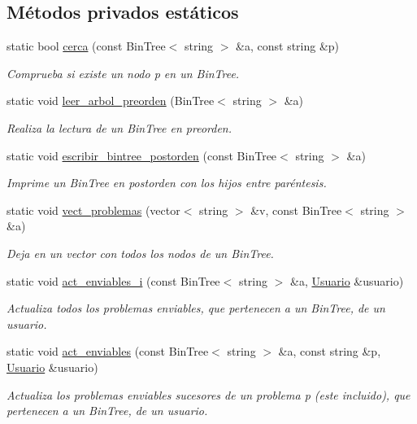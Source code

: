 \subsection*{Métodos privados estáticos}
\begin{DoxyCompactItemize}
\item 
static bool \mbox{\hyperlink{class_sesion_a975a083d65d04704efd0690de9d7f695}{cerca}} (const Bin\+Tree$<$ string $>$ \&a, const string \&p)
\begin{DoxyCompactList}\small\item\em Comprueba si existe un nodo p en un Bin\+Tree. \end{DoxyCompactList}\item 
static void \mbox{\hyperlink{class_sesion_ac3711bf39cf87739aff96ccebd6da0bc}{leer\+\_\+arbol\+\_\+preorden}} (Bin\+Tree$<$ string $>$ \&a)
\begin{DoxyCompactList}\small\item\em Realiza la lectura de un Bin\+Tree en preorden. \end{DoxyCompactList}\item 
static void \mbox{\hyperlink{class_sesion_aff16aa5e480925c7827221e326a345dc}{escribir\+\_\+bintree\+\_\+postorden}} (const Bin\+Tree$<$ string $>$ \&a)
\begin{DoxyCompactList}\small\item\em Imprime un Bin\+Tree en postorden con los hijos entre paréntesis. \end{DoxyCompactList}\item 
static void \mbox{\hyperlink{class_sesion_a9ed9478b2d860d8d713e19823febeaf3}{vect\+\_\+problemas}} (vector$<$ string $>$ \&v, const Bin\+Tree$<$ string $>$ \&a)
\begin{DoxyCompactList}\small\item\em Deja en un vector con todos los nodos de un Bin\+Tree. \end{DoxyCompactList}\item 
static void \mbox{\hyperlink{class_sesion_ad391d505577569f30635f19a0f36c9a0}{act\+\_\+enviables\+\_\+i}} (const Bin\+Tree$<$ string $>$ \&a, \mbox{\hyperlink{class_usuario}{Usuario}} \&usuario)
\begin{DoxyCompactList}\small\item\em Actualiza todos los problemas enviables, que pertenecen a un Bin\+Tree, de un usuario. \end{DoxyCompactList}\item 
static void \mbox{\hyperlink{class_sesion_a7e64b66ecf1ad363dd0c394ec59eaa91}{act\+\_\+enviables}} (const Bin\+Tree$<$ string $>$ \&a, const string \&p, \mbox{\hyperlink{class_usuario}{Usuario}} \&usuario)
\begin{DoxyCompactList}\small\item\em Actualiza los problemas enviables sucesores de un problema p (este incluido), que pertenecen a un Bin\+Tree, de un usuario. \end{DoxyCompactList}\end{DoxyCompactItemize}
